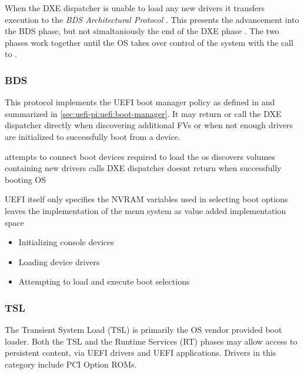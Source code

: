 When the \ac{DXE} dispatcher is unable to load any new drivers it transfers execution to the \emph{\ac{BDS} Architectural Protocol} \cite[Vol. 2, 2.4]{pi-spec}.
This presents the advancement into the \ac{BDS} phase, but not simaltaniously the end of the \ac{DXE} phase \cite[Vol. 2, 2.1]{pi-spec}.
The two phases work together until the \ac{OS} takes over control of the system with the call to .

\subsubsection{\acf{BDS}}

This protocol implements the \ac{UEFI} boot manager policy as defined in \cite[Section 3]{uefi-spec} and summarized in \autoref{sec:uefi-pi:uefi:boot-manager}.
It may return or call the \ac{DXE} dispatcher directly when discovering additional \acp{FV} or when not enough drivers are initialized to successfully boot from a device.


attempts to connect boot devices required to load the os
discovers volumes containing new drivers
calls DXE dispatcher
doesnt return when successfully booting OS

UEFI itself only specifies the NVRAM variables used in selecting boot options
leaves the implementation of the menu system as value added implementation space \cite{uefi-spec}

\cite{pi-spec}

\begin{itemize}
    \item Initializing console devices
    \item Loading device drivers
    \item Attempting to load and execute boot selections
\end{itemize}

\subsubsection{\acf{TSL}}


The Transient System Load (TSL) is primarily the OS vendor provided boot loader. Both the TSL and the Runtime Services (RT) phases may allow access to persistent content, via UEFI drivers and UEFI applications. Drivers in this category include PCI Option ROMs.

